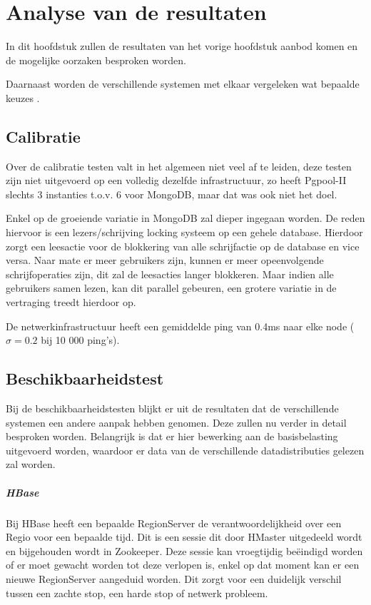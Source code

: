 \chapter{Analyse van de resultaten}
In dit hoofdstuk zullen de resultaten van het vorige hoofdstuk aanbod komen en de mogelijke oorzaken besproken worden. 

Daarnaast worden de verschillende systemen met elkaar vergeleken wat bepaalde keuzes . 
\section{Calibratie}
Over de calibratie testen valt in het algemeen niet veel af te leiden, deze testen zijn niet uitgevoerd op een volledig dezelfde infrastructuur, zo heeft Pgpool-II slechts 3 instanties t.o.v. 6 voor MongoDB, maar dat was ook niet het doel. 

Enkel op de groeiende variatie in MongoDB zal dieper ingegaan worden. De reden hiervoor is een lezers/schrijving locking systeem op een gehele database\cite{mongodb-concurrency}. Hierdoor zorgt een leesactie voor de blokkering van alle schrijfactie op de database en vice versa. Naar mate er meer gebruikers zijn, kunnen er meer opeenvolgende schrijfoperaties zijn, dit zal de leesacties langer blokkeren. Maar indien alle gebruikers samen lezen, kan dit parallel gebeuren, een grotere variatie in de vertraging treedt hierdoor op. 

De netwerkinfrastructuur heeft een gemiddelde ping van 0.4ms naar elke node ($\sigma = 0.2$ bij 10 000 ping's). 

\section{Beschikbaarheidstest}
Bij de beschikbaarheidstesten blijkt er uit de resultaten dat de verschillende systemen een andere aanpak hebben genomen. Deze zullen nu verder in detail besproken worden. Belangrijk  is dat er hier bewerking aan de basisbelasting uitgevoerd worden, waardoor er data van de verschillende datadistributies gelezen zal worden. 

\paragraph{HBase} Bij HBase heeft een bepaalde RegionServer de verantwoordelijkheid over een Regio voor een bepaalde tijd. Dit is een sessie dit door HMaster uitgedeeld wordt en bijgehouden wordt in Zookeeper. Deze sessie kan vroegtijdig beëindigd worden of er moet gewacht worden tot deze verlopen is, enkel op dat moment kan er een nieuwe RegionServer aangeduid worden. Dit zorgt voor een duidelijk verschil tussen een zachte stop, een harde stop of netwerk probleem. 

